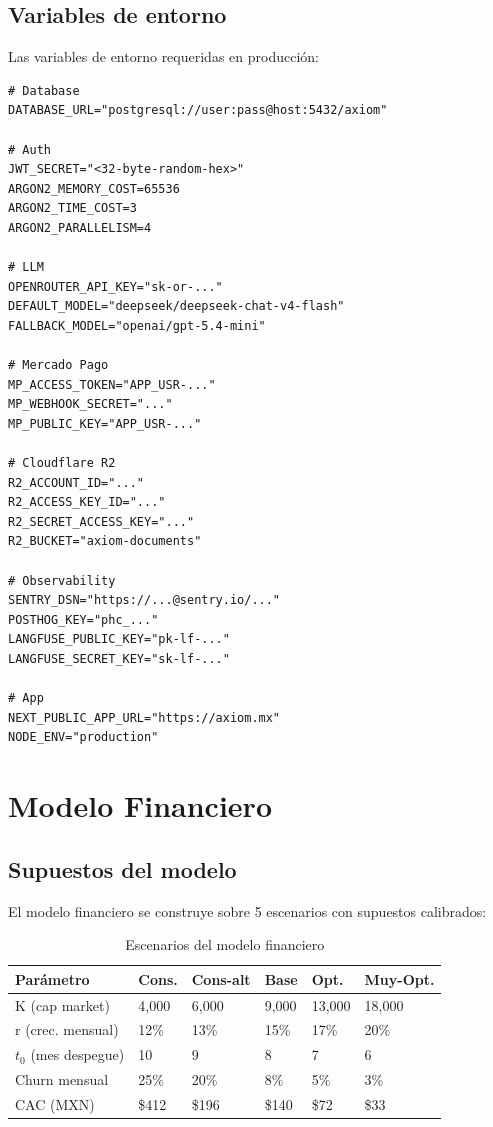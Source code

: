 \documentclass[10pt,a4paper,oneside]{report}
\begin{document}
\section{Variables de entorno}
Las variables de entorno requeridas en producción:

\begin{lstlisting}[style=bash,caption={Variables de entorno (template)}]
# Database
DATABASE_URL="postgresql://user:pass@host:5432/axiom"

# Auth
JWT_SECRET="<32-byte-random-hex>"
ARGON2_MEMORY_COST=65536
ARGON2_TIME_COST=3
ARGON2_PARALLELISM=4

# LLM
OPENROUTER_API_KEY="sk-or-..."
DEFAULT_MODEL="deepseek/deepseek-chat-v4-flash"
FALLBACK_MODEL="openai/gpt-5.4-mini"

# Mercado Pago
MP_ACCESS_TOKEN="APP_USR-..."
MP_WEBHOOK_SECRET="..."
MP_PUBLIC_KEY="APP_USR-..."

# Cloudflare R2
R2_ACCOUNT_ID="..."
R2_ACCESS_KEY_ID="..."
R2_SECRET_ACCESS_KEY="..."
R2_BUCKET="axiom-documents"

# Observability
SENTRY_DSN="https://...@sentry.io/..."
POSTHOG_KEY="phc_..."
LANGFUSE_PUBLIC_KEY="pk-lf-..."
LANGFUSE_SECRET_KEY="sk-lf-..."

# App
NEXT_PUBLIC_APP_URL="https://axiom.mx"
NODE_ENV="production"
\end{lstlisting}

\chapter{Modelo Financiero}

\section{Supuestos del modelo}
El modelo financiero se construye sobre 5 escenarios con supuestos calibrados:

\begin{table}[H]
\centering
\begin{tabular}{p{2.8cm}p{1.8cm}p{1.8cm}p{1.8cm}p{1.8cm}p{1.8cm}}
\toprule
\textbf{Parámetro} & \textbf{Cons.} & \textbf{Cons-alt} & \textbf{Base} & \textbf{Opt.} & \textbf{Muy-Opt.} \\
\midrule
K (cap market) & 4,000 & 6,000 & 9,000 & 13,000 & 18,000 \\
r (crec. mensual) & 12\% & 13\% & 15\% & 17\% & 20\% \\
$t_0$ (mes despegue) & 10 & 9 & 8 & 7 & 6 \\
Churn mensual & 25\% & 20\% & 8\% & 5\% & 3\% \\
CAC (MXN) & \$412 & \$196 & \$140 & \$72 & \$33 \\
\bottomrule
\end{tabular}
\caption{Escenarios del modelo financiero}
\end{table}
\end{document}
